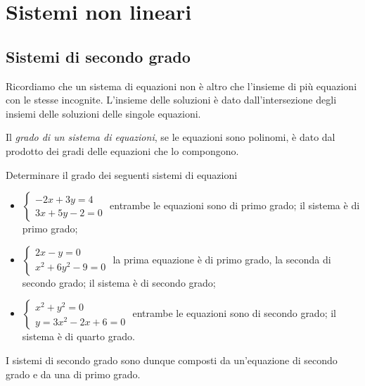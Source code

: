 \chapter{Sistemi non lineari}
\section{Sistemi di secondo grado}
Ricordiamo che un sistema di equazioni non è altro che l'insieme di più equazioni con le stesse incognite. L'insieme delle soluzioni è dato dall'intersezione degli insiemi delle soluzioni delle singole equazioni.

\begin{definizione}
Il \emph{grado di un sistema di equazioni}, se le equazioni sono polinomi, è dato dal prodotto dei gradi delle equazioni che lo compongono.
\end{definizione}

\begin{exrig}
\begin{esempio}
Determinare il grado dei seguenti sistemi di equazioni

\begin{itemize}
\item $\left\{\begin{array}{l}-2x+3y=4 \\3x+5y-2=0\end{array}\right.$ entrambe le equazioni sono di primo grado; il sistema è di primo grado;
\item $\left\{\begin{array}{l}2x-y=0 \\x^2+6y^2-9=0\end{array}\right.$ la prima equazione è di primo grado, la seconda di secondo grado; il sistema è di secondo grado;
\item $\left\{\begin{array}{l}x^2+y^2=0 \\y=3x^2-2x+6=0\end{array}\right.$ entrambe le equazioni sono di secondo grado; il sistema è di quarto grado.
\end{itemize}
\end{esempio}
\end{exrig}
I sistemi di secondo grado sono dunque composti da un'equazione di secondo grado e da una di primo grado.

